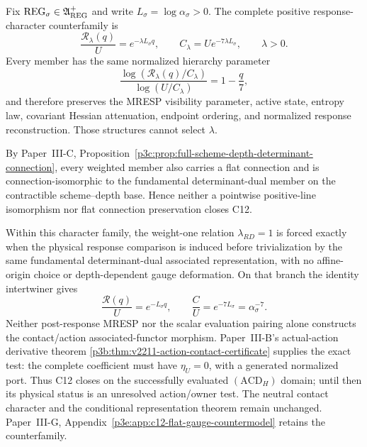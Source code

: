 \documentclass[12pt,a4paper]{article}
\begin{document}
\begin{proposition}
\label{p3e:prop:c12-scheme-depth-closure-criterion}
Fix $\mathrm{REG}_\sigma\in\mathfrak A_{\rm REG}^{+}$ and write
$L_\sigma=\log\alpha_\sigma>0$.  The complete positive response-character
counterfamily is
\begin{equation}
 \label{p3e:eq:c12-character-counterfamily}
 \frac{\mathcal R_\lambda(q)}{U}
 =e^{-\lambda L_\sigma q},\qquad
 C_\lambda=Ue^{-7\lambda L_\sigma},\qquad \lambda>0.
\end{equation}
Every member has the same normalized hierarchy parameter
\[
 \frac{\log(\mathcal R_\lambda(q)/C_\lambda)}
      {\log(U/C_\lambda)}=1-\frac q7,
\]
and therefore preserves the MRESP visibility parameter, active state,
entropy law, covariant Hessian attenuation, endpoint ordering, and normalized
response reconstruction.  Those structures cannot select $\lambda$.

By Paper~III-C,
Proposition~\ref{p3c:prop:full-scheme-depth-determinant-connection}, every
weighted member also carries a flat connection and is connection-isomorphic
to the fundamental determinant-dual member on the contractible
scheme--depth base.  Hence neither a pointwise positive-line isomorphism nor
flat connection preservation closes C12.

Within this character family, the weight-one relation
\(
 \lambda_{RD}=1
\)
is forced exactly when the physical response comparison is induced before
trivialization by the same fundamental determinant-dual associated
representation, with no affine-origin choice or depth-dependent gauge
deformation.  On that branch the identity intertwiner gives
\[
 \frac{\mathcal R(q)}U=e^{-L_\sigma q},
 \qquad
 \frac CU=e^{-7L_\sigma}=\alpha_\sigma^{-7}.
\]
Neither post-response MRESP nor the scalar evaluation pairing alone
constructs the contact/action associated-functor morphism. Paper~III-B's
actual-action derivative theorem
\ref{p3b:thm:v2211-action-contact-certificate} supplies the exact test:
the complete coefficient must have $\eta_U=0$, with a generated normalized
port. Thus C12 closes on the successfully evaluated $(\mathrm{ACD}_H)$
domain; until then its physical status is an unresolved action/owner test.
The neutral contact character and the conditional representation theorem
remain unchanged. Paper~III-G, Appendix~\ref{p3e:app:c12-flat-gauge-countermodel}
retains the counterfamily.
\end{proposition}
\end{document}
